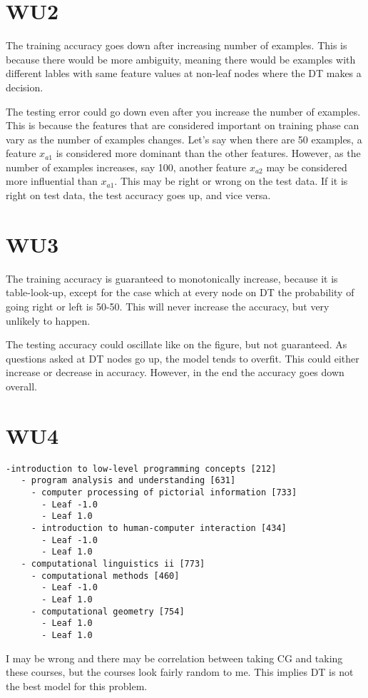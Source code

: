 \section*{WU2}
The training accuracy goes down after increasing number of examples. This is because there would be more ambiguity, meaning there would be examples with different lables with same feature values at non-leaf nodes where the DT makes a decision.

The testing error could go down even after you increase the number of examples. This is because the features that are considered important on training phase can vary as the number of examples changes. Let's say when there are 50 examples, a feature $x_{a1}$ is considered more dominant than the other features. However, as the number of examples increases, say 100, another feature $x_{a2}$ may be considered more influential than $x_{a1}$. This may be right or wrong on the test data. If it is right on test data, the test accuracy goes up, and vice versa.

\section*{WU3}
The training accuracy is guaranteed to monotonically increase, because it is table-look-up, except for the case which at every node on DT the probability of going right or left is 50-50. This will never increase the accuracy, but very unlikely to happen. 

The testing accuracy could oscillate like on the figure, but not guaranteed. As questions asked at DT nodes go up, the model tends to overfit. This could either increase or decrease in accuracy. However, in the end the accuracy goes down overall.


\section*{WU4}
  \begin{verbatim}
-introduction to low-level programming concepts [212]
   - program analysis and understanding [631]
     - computer processing of pictorial information [733]
       - Leaf -1.0
       - Leaf 1.0
     - introduction to human-computer interaction [434]
       - Leaf -1.0
       - Leaf 1.0
   - computational linguistics ii [773]
     - computational methods [460]
       - Leaf -1.0
       - Leaf 1.0
     - computational geometry [754]
       - Leaf 1.0
       - Leaf 1.0
  \end{verbatim}
I may be wrong and there may be correlation between taking CG and taking these courses, but the courses look fairly random to me. This implies DT is not the best model for this problem.